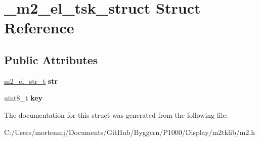 \hypertarget{struct__m2__el__tsk__struct}{\section{\-\_\-m2\-\_\-el\-\_\-tsk\-\_\-struct Struct Reference}
\label{struct__m2__el__tsk__struct}
}
\subsection*{Public Attributes}
\begin{DoxyCompactItemize}
\item 
\hypertarget{struct__m2__el__tsk__struct_a42bb3b0759377f0853375159ded87418}{\hyperlink{struct__m2__el__str__struct}{m2\-\_\-el\-\_\-str\-\_\-t} {\bfseries str}}\label{struct__m2__el__tsk__struct_a42bb3b0759377f0853375159ded87418}

\item 
\hypertarget{struct__m2__el__tsk__struct_a6d349d2a7537e1a26a6cf58f949c1842}{uint8\-\_\-t {\bfseries key}}\label{struct__m2__el__tsk__struct_a6d349d2a7537e1a26a6cf58f949c1842}

\end{DoxyCompactItemize}


The documentation for this struct was generated from the following file\-:\begin{DoxyCompactItemize}
\item 
C\-:/\-Users/mortenmj/\-Documents/\-Git\-Hub/\-Byggern/\-P1000/\-Display/m2tklib/m2.\-h\end{DoxyCompactItemize}
